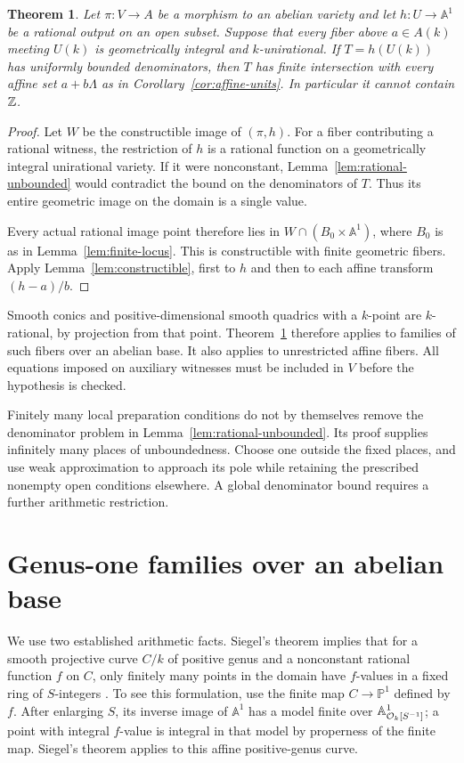 \documentclass[11pt,a4paper]{article}
\newtheorem{theorem}{Theorem}[section]
\theoremstyle{definition}
\newcommand{\A}{\mathbb A}\newcommand{\PP}{\mathbb P}
\begin{document}
\begin{theorem}\label{thm:unirational}
Let $\pi:V\to A$ be a morphism to an abelian variety and let
$h:U\to\A^1$ be a rational output on an open subset. Suppose
that every fiber above $a\in A(k)$ meeting $U(k)$ is geometrically
integral and $k$-unirational. If $T=h(U(k))$ has uniformly bounded
denominators, then $T$ has finite intersection with every affine
set $a+b\Lambda$ as in Corollary~\ref{cor:affine-units}.
In particular it cannot contain $\mathbb Z$.
\end{theorem}
\begin{proof}
Let $W$ be the constructible image of $(\pi,h)$. For a fiber
contributing a rational witness, the restriction of $h$ is a
rational function on a geometrically integral unirational variety.
If it were nonconstant, Lemma~\ref{lem:rational-unbounded} would
contradict the bound on the denominators of $T$. Thus its entire
geometric image on the domain is a single value.

Every actual rational image point therefore lies in
$W\cap(B_0\times\A^1)$, where $B_0$ is as in
Lemma~\ref{lem:finite-locus}. This is constructible with finite
geometric fibers. Apply Lemma~\ref{lem:constructible}, first to
$h$ and then to each affine transform $(h-a)/b$.
\end{proof}

Smooth conics and positive-dimensional smooth quadrics with a
$k$-point are $k$-rational, by projection from that point.
Theorem~\ref{thm:unirational} therefore applies to families of
such fibers over an abelian base. It also applies to unrestricted
affine fibers. All equations imposed on auxiliary witnesses must
be included in $V$ before the hypothesis is checked.

Finitely many local preparation conditions do not by themselves
remove the denominator problem in Lemma~\ref{lem:rational-unbounded}.
Its proof supplies infinitely many places of unboundedness. Choose
one outside the fixed places, and use weak approximation to approach
its pole while retaining the prescribed nonempty open conditions
elsewhere. A global denominator bound requires a further arithmetic
restriction.

\section{Genus-one families over an abelian base}

We use two established arithmetic facts. Siegel's theorem implies
that for a smooth projective curve $C/k$ of positive genus and a
nonconstant rational function $f$ on $C$, only finitely many points
in the domain have $f$-values in a fixed ring of $S$-integers
\cite[Section 1]{VojtaSurvey}. To see this formulation, use the
finite map $C\to\PP^1$ defined by $f$. After enlarging $S$, its
inverse image of $\A^1$ has a model finite over $\A^1_{\Ok[S^{-1}]}$;
a point with integral $f$-value is integral in that model by
properness of the finite map. Siegel's theorem applies to this
affine positive-genus curve.
\end{document}
